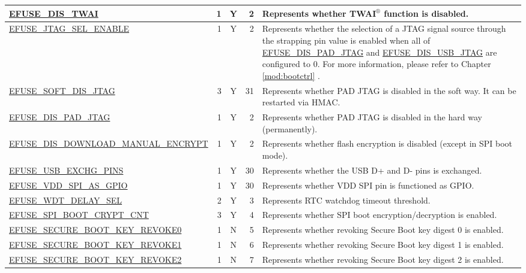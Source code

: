 \begin{longtable}[l]{ |m{8.2cm}|r|c|r|m{9cm}| }
    \hline
    \hyperref[fielddesc:EFUSEDISTWAI]{EFUSE\_DIS\_TWAI} & 1 & Y & 2 & Represents whether TWAI$^®$ function is disabled.\\
    \hline
    \hyperref[fielddesc:EFUSEJTAGSELENABLE]{EFUSE\_JTAG\_SEL\_ENABLE} & 1 & Y & 2 & Represents whether the selection of a JTAG signal source through the strapping pin value is enabled when all of \hyperref[fielddesc:EFUSEDISPADJTAG]{EFUSE\_DIS\_PAD\_JTAG} and \hyperref[fielddesc:EFUSEDISUSBJTAG]{EFUSE\_DIS\_USB\_JTAG} are configured to 0. For more information, please refer to Chapter \ref{mod:bootctrl} \textit{\nameref{mod:bootctrl}}.\\
    \hline
    \hyperref[fielddesc:EFUSESOFTDISJTAG]{EFUSE\_SOFT\_DIS\_JTAG} & 3 & Y & 31 & Represents whether PAD JTAG is disabled in the soft way. It can be restarted via HMAC.\\
    \hline
    \hyperref[fielddesc:EFUSEDISPADJTAG]{EFUSE\_DIS\_PAD\_JTAG} & 1 & Y & 2 & Represents whether PAD JTAG is disabled in the hard way (permanently).\\
    \hline
    \hyperref[fielddesc:EFUSEDISDOWNLOADMANUALENCRYPT]{EFUSE\_DIS\_DOWNLOAD\_MANUAL\_ENCRYPT} &  1 & Y & 2 & Represents whether flash encryption is disabled (except in SPI boot mode).\\
    \hline
    \hyperref[fielddesc:EFUSEUSBEXCHGPINS]{EFUSE\_USB\_EXCHG\_PINS}  & 1 & Y & 30  & Represents whether the USB D+ and D- pins is exchanged.
\\
    \hline
    \hyperref[fielddesc:EFUSEVDDSPIASGPIO]{EFUSE\_VDD\_SPI\_AS\_GPIO}  & 1 & Y & 30  & Represents whether VDD SPI pin is functioned as GPIO.\\
    \hline
    \hyperref[fielddesc:EFUSEWDTDELAYSEL]{EFUSE\_WDT\_DELAY\_SEL} & 2 & Y & 3 & Represents RTC watchdog timeout threshold.\\
    \hline
    \hyperref[fielddesc:EFUSESPIBOOTCRYPTCNT]{EFUSE\_SPI\_BOOT\_CRYPT\_CNT} & 3 & Y & 4 & Represents whether SPI boot encryption/decryption is enabled.\\
    \hline
    \hyperref[fielddesc:EFUSESECUREBOOTKEYREVOKE0]{EFUSE\_SECURE\_BOOT\_KEY\_REVOKE0} & 1 & N & 5 & Represents whether revoking Secure Boot key digest 0 is enabled.\\
    \hline
    \hyperref[fielddesc:EFUSESECUREBOOTKEYREVOKE1]{EFUSE\_SECURE\_BOOT\_KEY\_REVOKE1} & 1 & N & 6 & Represents whether revoking Secure Boot key digest 1 is enabled.\\
    \hline
    \hyperref[fielddesc:EFUSESECUREBOOTKEYREVOKE2]{EFUSE\_SECURE\_BOOT\_KEY\_REVOKE2} & 1 & N & 7 & Represents whether revoking Secure Boot key digest 2 is enabled.\\

\end{longtable}
